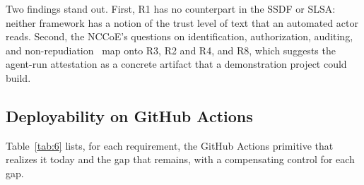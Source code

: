 \documentclass[acmsmall,screen,review]{acmart}
\begin{document}
Two findings stand out. First, R1 has no counterpart in the SSDF or SLSA: neither framework has a notion of the trust level of text that an automated actor reads. Second, the NCCoE's questions on identification, authorization, auditing, and non-repudiation~\cite{booth2026accelerating} map onto R3, R2 and R4, and R8, which suggests the agent-run attestation as a concrete artifact that a demonstration project could build.


\subsection{Deployability on GitHub Actions}\label{sec:8.3}

Table~\ref{tab:6} lists, for each requirement, the GitHub Actions primitive that realizes it today and the gap that remains, with a compensating control for each gap.
\end{document}
